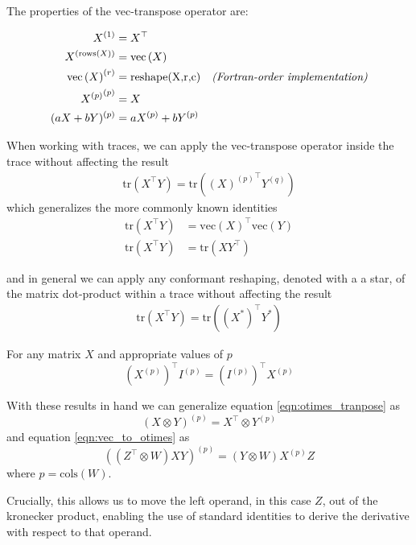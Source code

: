 \documentclass[10pt,fleqn]{article}
\newcommand \vecf[1] {
    \text{vec}\left(#1\right)
}
\newcommand \tr { \text{tr} }
\newcommand \T { ^\top }
\newcommand \Tr[1]   { \tr \left(  {#1}  \right) }
\newcommand \vt[2] { { #1^{(#2)} } }
\begin{document}
\begin{appendices}
The properties of the vec-transpose operator are:

\begin{align}
\vt{X}{1} & = X\T \\
\vt{X}{\text{rows}(X)} & = \vecf{X} \\
\vt{\vecf{X}}{r} & = \text{reshape(X,r,c)} & \text{\emph{(Fortran-order implementation)}} \\
\vt{\vt{X}{p}}{p} & = X \label{eqn:a_pp_is_a} \\
\vt{(aX + bY)}{p} & = a\vt{X}{p} + b\vt{Y}{p}
\end{align}

When working with traces, we can apply the vec-transpose operator inside the trace without affecting the result
\begin{align}
\Tr{X\T Y} = \Tr{\vt{(X)}{p}\T \vt{Y}{q}}
\end{align}
which generalizes the more commonly known identities
\begin{align}
\Tr{X\T Y} & = \vecf{X}\T\vecf{Y} \\
\Tr{X\T Y} & = \Tr{X Y\T}
\end{align}

and in general we can apply any conformant reshaping, denoted with a a star, of the matrix dot-product within a trace without affecting the result
\begin{align}
\Tr{X\T Y} = \Tr{(X^*)\T Y^*} \label{eqn:tr_reshape}
\end{align}

For any matrix $X$ and appropriate values of $p$
\begin{equation}
    \left(\vt{X}{p}\right)\T \vt{I}{p} = \left(\vt{I}{p}\right)\T \vt{X}{p} \label{eqn:dot_of_vt_of_symmetric}
\end{equation}



With these results in hand we can generalize equation \eqref{eqn:otimes_tranpose} as
\begin{equation}
\vt{(X \otimes Y)}{p} = X\T \otimes \vt{Y}{p} \label{eqn:vt_of_otimes}
\end{equation}
and equation \eqref{eqn:vec_to_otimes} as
\begin{equation}
\vt{\left((Z\T \otimes W)XY \right)}{p} = (Y \otimes W)\vt{X}{p}Z \label{eqn:extract_left_kro_opnd}
\end{equation}
where $p = \text{cols}(W)$.

Crucially, this allows us to move the left operand, in this case $Z$, out of the kronecker product, enabling the use of standard identities to derive the derivative with respect to that operand.


\end{appendices}
\end{document}
